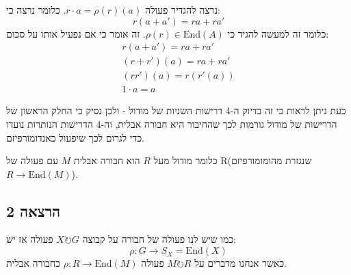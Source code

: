 \documentclass{tstextbook}
\begin{document}
נרצה להגדיר פעולה \(r\cdot a = \rho(r)(a)\). כלומר נרצה כי:
$$r(a+a')=ra+ra'$$
כלומר זה למעשה להגיד כי \(\rho(r)\in \mathrm{End}(A)\). זה אומר כי אם נפעיל אותו על סכום:
$$\begin{gather}r(a+a')=ra+ra' \\(r+r')(a)=ra+ra' \\(rr')(a)=r(r'(a)) \\1\cdot a = a
\end{gather}$$

כעת ניתן לראות כי זה בדיוק ה-4 דרישות השניות של מודול - ולכן נסיק כי החלק הראשון של הדרישות של מודול גורמות לכך שהחיבור היא חבורה אבלית, וה-4 הדרישות הנותרות נועדו כדי לגרום לכך שיפעול כאנדומורפיזם. 

כלומר מודול מעל \(R\) הוא חבורה אבלית \(M\) עם פעולה של R(שנגזרת מהומומורפיזם \(R\to \mathrm{End}(M)\)).

\subsection{הרצאה 2}

כמו שיש לנו פעולה של חבורה על קבוצה \(X\circlearrowright G\) פעולה אז יש:
$$\rho:G\to S_{X}=\mathrm{End}(X)$$
כאשר אנחנו מדברים על \(M\circlearrowright R\) פעולה \(\rho:R\to \mathrm{End}(M)\) כחבורה אבלית.
\end{document}
